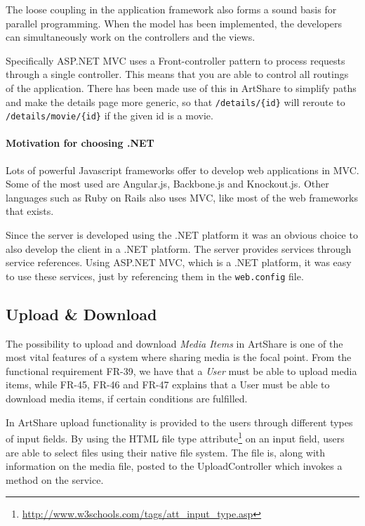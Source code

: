 \documentclass[../report.tex]{subfiles}
\begin{document}
The loose coupling in the application framework also forms a sound basis for parallel programming. When the model has been implemented, the developers can simultaneously work on the controllers and the views.

Specifically ASP.NET MVC uses a Front-controller pattern to process requests through a single controller. This means that you are able to control all routings of the application. There has been made use of this in ArtShare to simplify paths and make the details page more generic, so that \texttt{/details/\{id\}} will reroute to \texttt{/details/movie/\{id\}} if the given id is a movie.

\paragraph{Motivation for choosing .NET}
Lots of powerful Javascript frameworks offer to develop web applications in MVC. Some of the most used are Angular.js, Backbone.js and Knockout.js. Other languages such as Ruby on Rails also uses MVC, like most of the web frameworks that exists.

Since the server is developed using the .NET platform it was an obvious choice to also develop the client in a .NET platform. The server provides services through service references. Using ASP.NET MVC, which is a .NET platform, it was easy to use these services, just by referencing them in the \texttt{web.config} file. 

\subsection{Upload \& Download}

The possibility to upload and download \textit{Media Items} in ArtShare is one of the most vital features of a system where sharing media is the focal point. From the functional requirement FR-39, we have that a \textit{User} must be able to upload media items, while FR-45, FR-46 and FR-47 explains that a User must be able to download media items, if certain conditions are fulfilled.

In ArtShare upload functionality is provided to the users through different types of input fields. By using the HTML file type attribute\footnote{\url{http://www.w3schools.com/tags/att\_input\_type.asp}} on an input field, users are able to select files using their native file system. The file is, along with information on the media file, posted to the UploadController which invokes a method on the service.
\end{document}
